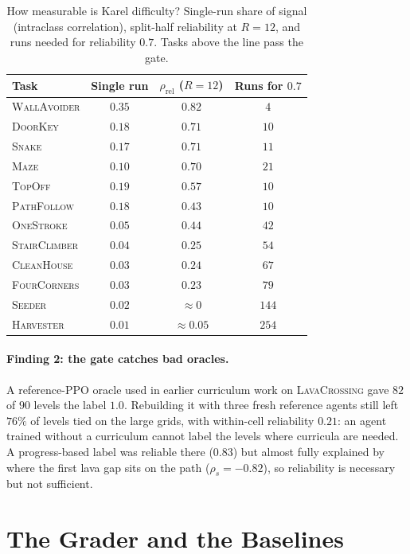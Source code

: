 \documentclass[twoside]{article}
\begin{document}
\begin{table}[t]
\centering
\small
\caption{How measurable is Karel difficulty? Single-run share of signal (intraclass correlation), split-half reliability at $R=12$, and runs needed for reliability $0.7$. Tasks above the line pass the gate.}
\label{tab:karel}
\setlength{\tabcolsep}{4pt}
\begin{tabular}{lccc}
\toprule
Task & Single run & $\rho_{\mathrm{rel}}$ ($R{=}12$) & Runs for $0.7$ \\
\midrule
\textsc{WallAvoider} & $0.35$ & $0.82$ & $4$ \\
\textsc{DoorKey}     & $0.18$ & $0.71$ & $10$ \\
\textsc{Snake}       & $0.17$ & $0.71$ & $11$ \\
\textsc{Maze}        & $0.10$ & $0.70$ & $21$ \\
\textsc{TopOff}      & $0.19$ & $0.57$ & $10$ \\
\midrule
\textsc{PathFollow}  & $0.18$ & $0.43$ & $10$ \\
\textsc{OneStroke}   & $0.05$ & $0.44$ & $42$ \\
\textsc{StairClimber}& $0.04$ & $0.25$ & $54$ \\
\textsc{CleanHouse}  & $0.03$ & $0.24$ & $67$ \\
\textsc{FourCorners} & $0.03$ & $0.23$ & $79$ \\
\textsc{Seeder}      & $0.02$ & ${\approx}0$ & $144$ \\
\textsc{Harvester}   & $0.01$ & ${\approx}0.05$ & $254$ \\
\bottomrule
\end{tabular}
\end{table}

\paragraph{Finding 2: the gate catches bad oracles.} A reference-PPO oracle used in earlier curriculum work on \textsc{LavaCrossing} gave $82$ of $90$ levels the label $1.0$. Rebuilding it with three fresh reference agents still left $76\%$ of levels tied on the large grids, with within-cell reliability $0.21$: an agent trained without a curriculum cannot label the levels where curricula are needed. A progress-based label was reliable there ($0.83$) but almost fully explained by where the first lava gap sits on the path ($\rho_s=-0.82$), so reliability is necessary but not sufficient.

\section{The Grader and the Baselines}
\label{sec:geometric-predictor}
\end{document}
